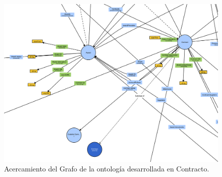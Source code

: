         \begin{figure}[ht!]
            \includegraphics[width=150mm]{figuras/zoomContract.png}
            \caption{Acercamiento del Grafo de la ontología desarrollada en Contracto.}
            \label{img:zoomContract}
            \end{figure}